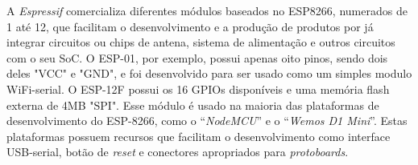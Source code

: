 A \textit{Espressif} comercializa diferentes módulos baseados no ESP8266, numerados de 1 até 12, que facilitam o desenvolvimento e a produção de produtos por já integrar circuitos ou chips de antena, sistema de alimentação e outros circuitos com o seu SoC. O ESP-01, por exemplo, possui apenas oito pinos, sendo dois deles "VCC" e "GND", e foi desenvolvido para ser usado como um simples modulo WiFi-serial. O ESP-12F possui os 16 GPIOs disponíveis e uma memória flash externa de 4MB "SPI". Esse módulo é usado na maioria das plataformas de desenvolvimento do ESP-8266, como o “\textit{NodeMCU}” e o “\textit{Wemos D1 Mini}”. Estas plataformas possuem recursos que facilitam o desenvolvimento como interface USB-serial, botão de \textit{reset} e conectores apropriados para \textit{protoboards}.

